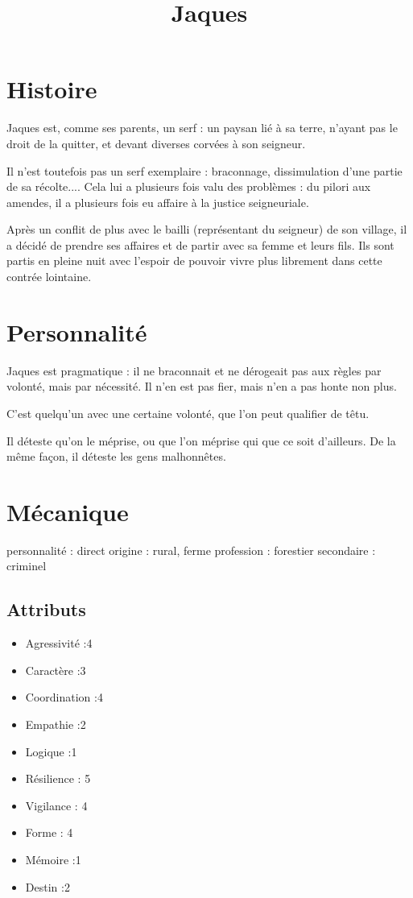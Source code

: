 \documentclass[10pt,a4paper]{article}
\title{Jaques}
\date{}
\begin{document}
\maketitle
\section{Histoire}
Jaques est, comme ses parents, un serf : un paysan lié à sa terre, n'ayant pas le droit de la quitter, et devant diverses corvées à son seigneur.

Il n'est toutefois pas un serf exemplaire : braconnage, dissimulation d'une partie de sa récolte.... Cela lui a plusieurs fois valu des problèmes : du pilori aux amendes, il a plusieurs fois eu affaire à la justice seigneuriale.

Après un conflit de plus avec le bailli (représentant du seigneur) de son village, il a décidé de prendre ses affaires et de partir avec sa femme et leurs fils. Ils sont partis en pleine nuit avec l'espoir de pouvoir vivre plus librement dans cette contrée lointaine.
\section{Personnalité}
Jaques est pragmatique : il ne braconnait et ne dérogeait pas aux règles par volonté, mais par nécessité. Il n'en est pas fier, mais n'en a pas honte non plus.

C'est quelqu'un avec une certaine volonté, que l'on peut qualifier de têtu.

Il déteste qu'on le méprise, ou que l'on méprise qui que ce soit d'ailleurs. De la même façon, il déteste les gens malhonnêtes.
\section{Mécanique}
personnalité : direct
origine : rural, ferme
profession : forestier
secondaire : criminel
\subsection{Attributs}
\begin{itemize}
\item Agressivité :4
\item Caractère :3
\item Coordination :4
\item Empathie :2
\item Logique :1
\item Résilience : 5
\item Vigilance : 4
\item Forme : 4
\item Mémoire :1
\item Destin :2
\end{itemize}
\end{document}

